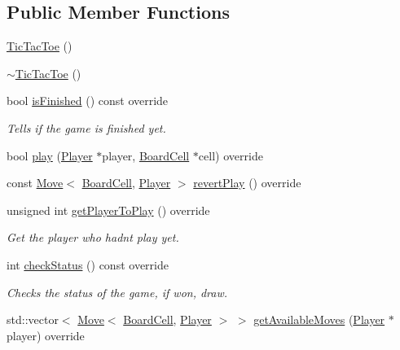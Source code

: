 \subsection*{Public Member Functions}
\begin{DoxyCompactItemize}
\item 
\hyperlink{classgame_1_1tic__tac__toe_1_1_tic_tac_toe_a93cde8c52c356cd36a622d33964596d8}{Tic\+Tac\+Toe} ()
\item 
\hyperlink{classgame_1_1tic__tac__toe_1_1_tic_tac_toe_a96ffdd3e87d5102414ac5862e19c975d}{$\sim$\+Tic\+Tac\+Toe} ()
\item 
bool \hyperlink{classgame_1_1tic__tac__toe_1_1_tic_tac_toe_a06463011bee6de3d33946f9162970989}{is\+Finished} () const override
\begin{DoxyCompactList}\small\item\em Tells if the game is finished yet. \end{DoxyCompactList}\item 
bool \hyperlink{classgame_1_1tic__tac__toe_1_1_tic_tac_toe_a68edd6e6abdd924bc2eae503621492bb}{play} (\hyperlink{classgame_1_1tic__tac__toe_1_1_player}{Player} $\ast$player, \hyperlink{classgame_1_1tic__tac__toe_1_1_board_cell}{Board\+Cell} $\ast$cell) override
\item 
const \hyperlink{structgame_1_1_move}{Move}$<$ \hyperlink{classgame_1_1tic__tac__toe_1_1_board_cell}{Board\+Cell}, \hyperlink{classgame_1_1tic__tac__toe_1_1_player}{Player} $>$ \hyperlink{classgame_1_1tic__tac__toe_1_1_tic_tac_toe_a38a848001838eb4ccbafa9800f3cbfd4}{revert\+Play} () override
\item 
unsigned int \hyperlink{classgame_1_1tic__tac__toe_1_1_tic_tac_toe_ae460add5608bc785e202c876dea8f9ba}{get\+Player\+To\+Play} () override
\begin{DoxyCompactList}\small\item\em Get the player who hadn\textquotesingle{}t play yet. \end{DoxyCompactList}\item 
int \hyperlink{classgame_1_1tic__tac__toe_1_1_tic_tac_toe_a033d73237ae31a39c23a0e887adbce2f}{check\+Status} () const override
\begin{DoxyCompactList}\small\item\em Checks the status of the game, if won, draw. \end{DoxyCompactList}\item 
std\+::vector$<$ \hyperlink{structgame_1_1_move}{Move}$<$ \hyperlink{classgame_1_1tic__tac__toe_1_1_board_cell}{Board\+Cell}, \hyperlink{classgame_1_1tic__tac__toe_1_1_player}{Player} $>$ $>$ \hyperlink{classgame_1_1tic__tac__toe_1_1_tic_tac_toe_af5dd08e48f442a4f54402423e996887f}{get\+Available\+Moves} (\hyperlink{classgame_1_1tic__tac__toe_1_1_player}{Player} $\ast$player) override

\end{DoxyCompactItemize}
